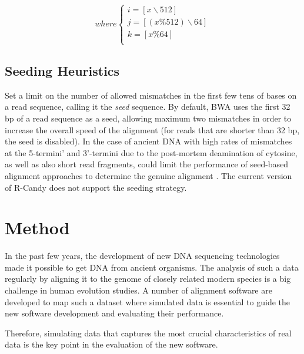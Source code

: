\documentclass[11pt,a4paper]{report}
\begin{document}
\[ where
\begin{cases}
	i=[ x \backslash 512 ]\\
	j=[(x \% 512 )\backslash 64 ]\\
	k=[ x \% 64  ]\\
\end{cases}
\]


\subsection{Seeding Heuristics}

Set a limit on the number of allowed mismatches in the first few tens of bases
on a read sequence, calling it the \emph{seed} sequence.
By default, BWA uses the first 32 bp of a read sequence as a seed, allowing 
maximum two mismatches in order to increase the overall speed of the alignment 
(for reads that are shorter than 32 bp, the seed is disabled)\cite{bwa}. 
In the case of ancient DNA with high rates of mismatches at the 5-termini' and 
3'-termini due to the post-mortem deamination of cytosine, as well as also short 
read fragments, could limit the performance of seed-based alignment approaches 
to determine the genuine alignment .
The current version of R-Candy does not support the seeding strategy.




\section{Method} \label{Method}

In the past few years, the development of new DNA sequencing technologies made 
it possible to get DNA from ancient organisms.
The analysis of such a data regularly by aligning it to the genome of closely 
related modern species is a big challenge in human evolution studies.
A number of alignment software are developed to map such a dataset where 
simulated data is essential to guide the new software development and 
evaluating their performance.

Therefore, simulating data that captures the most crucial characteristics 
of real data is the key point in the evaluation of the new software.\\
\end{document}

